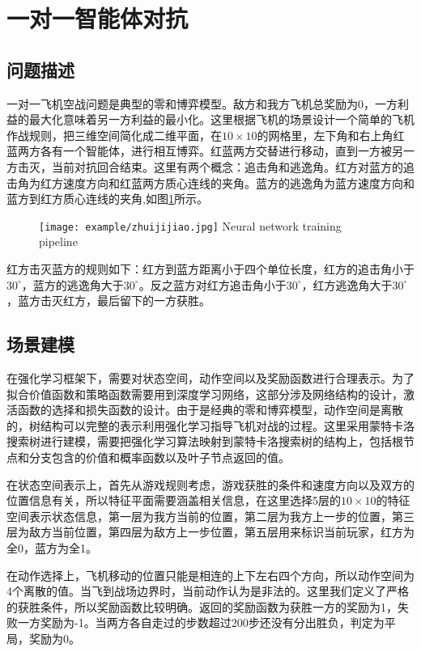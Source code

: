 \section{一对一智能体对抗}
\subsection{问题描述}
一对一飞机空战问题是典型的零和博弈模型。敌方和我方飞机总奖励为0，一方利益的最大化意味着另一方利益的最小化。这里根据飞机的场景设计一个简单的飞机作战规则，把三维空间简化成二维平面，在$10 \times 10$的网格里，左下角和右上角红蓝两方各有一个智能体，进行相互博弈。红蓝两方交替进行移动，直到一方被另一方击灭，当前对抗回合结束。这里有两个概念：追击角和逃逸角。红方对蓝方的追击角为红方速度方向和红蓝两方质心连线的夹角。蓝方的逃逸角为蓝方速度方向和蓝方到红方质心连线的夹角,如图\ref{fig:zhuijijiao}所示。
\begin{figure}[htbp]
	\centering
	\texttt{[image: example/zhuijijiao.jpg]}
	{Neural network training pipeline}
	\label{fig:zhuijijiao}
\end{figure}

红方击灭蓝方的规则如下：红方到蓝方距离小于四个单位长度，红方的追击角小于$30^\circ$，蓝方的逃逸角大于$30^\circ$。反之蓝方对红方追击角小于$30^\circ$，红方逃逸角大于$30^\circ$，蓝方击灭红方，最后留下的一方获胜。

\subsection{场景建模}
在强化学习框架下，需要对状态空间，动作空间以及奖励函数进行合理表示。为了拟合价值函数和策略函数需要用到深度学习网络，这部分涉及网络结构的设计，激活函数的选择和损失函数的设计。由于是经典的零和博弈模型，动作空间是离散的，树结构可以完整的表示利用强化学习指导飞机对战的过程。这里采用蒙特卡洛搜索树进行建模，需要把强化学习算法映射到蒙特卡洛搜索树的结构上，包括根节点和分支包含的价值和概率函数以及叶子节点返回的值。

在状态空间表示上，首先从游戏规则考虑，游戏获胜的条件和速度方向以及双方的位置信息有关，所以特征平面需要涵盖相关信息，在这里选择5层的$10 \times 10$的特征空间表示状态信息，第一层为我方当前的位置，第二层为我方上一步的位置，第三层为敌方当前位置，第四层为敌方上一步位置，第五层用来标识当前玩家，红方为全0，蓝方为全1。

在动作选择上，飞机移动的位置只能是相连的上下左右四个方向，所以动作空间为4个离散的值。当飞到战场边界时，当前动作认为是非法的。这里我们定义了严格的获胜条件，所以奖励函数比较明确。返回的奖励函数为获胜一方的奖励为1，失败一方奖励为-1。当两方各自走过的步数超过200步还没有分出胜负，判定为平局，奖励为0。

